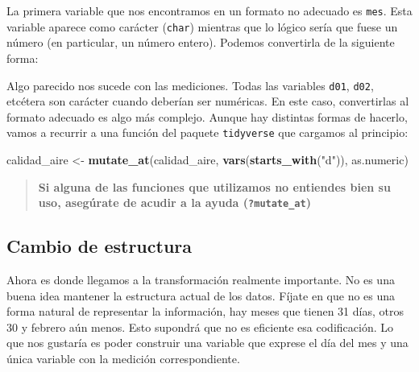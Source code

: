 \documentclass[]{article}
\newenvironment{Shaded}{\begin{snugshade}}{\end{snugshade}}
\newcommand{\KeywordTok}[1]{\textcolor[rgb]{0.13,0.29,0.53}{\textbf{#1}}}
\newcommand{\NormalTok}[1]{#1}
\newcommand{\OperatorTok}[1]{\textcolor[rgb]{0.81,0.36,0.00}{\textbf{#1}}}
\newcommand{\StringTok}[1]{\textcolor[rgb]{0.31,0.60,0.02}{#1}}
\begin{document}
La primera variable que nos encontramos en un formato no adecuado es
\texttt{mes}. Esta variable aparece como carácter (\texttt{char})
mientras que lo lógico sería que fuese un número (en particular, un
número entero). Podemos convertirla de la siguiente forma:

\begin{Shaded}
\end{Shaded}

Algo parecido nos sucede con las mediciones. Todas las variables
\texttt{d01}, \texttt{d02}, etcétera son carácter cuando deberían ser
numéricas. En este caso, convertirlas al formato adecuado es algo más
complejo. Aunque hay distintas formas de hacerlo, vamos a recurrir a una
función del paquete \texttt{tidyverse} que cargamos al principio:

\begin{Shaded}
\begin{Highlighting}[]
\NormalTok{calidad_aire <-}\StringTok{ }\KeywordTok{mutate_at}\NormalTok{(calidad_aire, }\KeywordTok{vars}\NormalTok{(}\KeywordTok{starts_with}\NormalTok{(}\StringTok{"d"}\NormalTok{)), as.numeric)}
\end{Highlighting}
\end{Shaded}

\begin{quote}
\textbf{Si alguna de las funciones que utilizamos no entiendes bien su
uso, asegúrate de acudir a la ayuda (\texttt{?mutate\_at})}
\end{quote}

\hypertarget{cambio-de-estructura}{%
\subsection{Cambio de estructura}\label{cambio-de-estructura}}

Ahora es donde llegamos a la transformación realmente importante. No es
una buena idea mantener la estructura actual de los datos. Fíjate en que
no es una forma natural de representar la información, hay meses que
tienen 31 días, otros 30 y febrero aún menos. Esto supondrá que no es
eficiente esa codificación. Lo que nos gustaría es poder construir una
variable que exprese el día del mes y una única variable con la medición
correspondiente.
\end{document}
